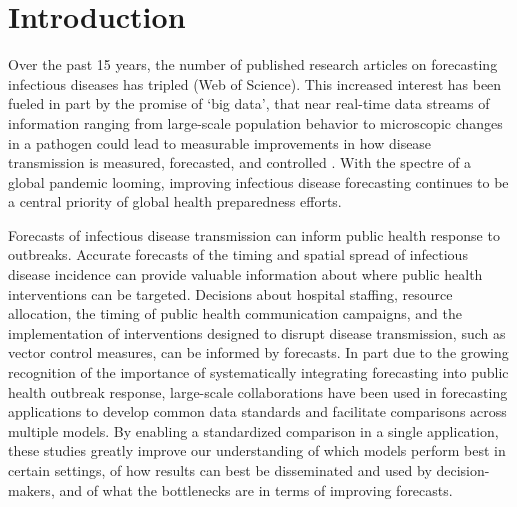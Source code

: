 \documentclass{article}\usepackage[]{graphicx}\usepackage[]{color}
\begin{document}









\section*{Introduction}

Over the past 15 years, the number of published research articles on forecasting infectious diseases has tripled (Web of Science). 
This increased interest has been fueled in part by the promise of `big data', that near real-time data streams of information ranging from large-scale population behavior \cite{Molodecky2017} to microscopic changes in a pathogen \cite{Du2017} could lead to measurable improvements in how disease transmission is measured, forecasted, and controlled \cite{Bansal2016}. 
With the spectre of a global pandemic looming, improving infectious disease forecasting continues to be a central priority of global health preparedness efforts.\cite{Myers2000,WorldHealthOrganization2016,Chretien2015}

Forecasts of infectious disease transmission can inform public health response to outbreaks. 
Accurate forecasts of the timing and spatial spread of infectious disease incidence can provide valuable information about where public health interventions can be targeted.\cite{Lipsitch2011}
Decisions about hospital staffing, resource allocation, the timing of public health communication campaigns, and the implementation of interventions designed to disrupt disease transmission, such as vector control measures, can be informed by forecasts.
In part due to the growing recognition of the importance of systematically integrating forecasting into public health outbreak response, large-scale collaborations have been used in forecasting applications to develop common data standards and facilitate comparisons across multiple models.\cite{Biggerstaff2016,Smith2017,Biggerstaff2018,Viboud2017}
By enabling a standardized comparison in a single application, these studies greatly improve our understanding of which models perform best in certain settings, of how results can best be disseminated and used by decision-makers, and of what the bottlenecks are in terms of improving forecasts.
\end{document}
